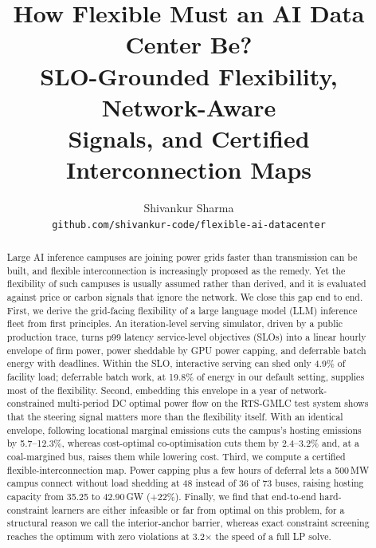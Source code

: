 \documentclass{article} %
\title{How Flexible Must an AI Data Center Be? \\ SLO-Grounded Flexibility, Network-Aware \\ Signals, and Certified Interconnection Maps}
\author{Shivankur Sharma\\
\texttt{github.com/shivankur-code/flexible-ai-datacenter}
}
\begin{document}
\maketitle
{}

\begin{abstract}
Large AI inference campuses are joining power grids faster than transmission can be built, and flexible interconnection is increasingly proposed as the remedy. Yet the flexibility of such campuses is usually assumed rather than derived, and it is evaluated against price or carbon signals that ignore the network. We close this gap end to end. First, we derive the grid-facing flexibility of a large language model (LLM) inference fleet from first principles. An iteration-level serving simulator, driven by a public production trace, turns p99 latency service-level objectives (SLOs) into a linear hourly envelope of firm power, power sheddable by GPU power capping, and deferrable batch energy with deadlines. Within the SLO, interactive serving can shed only 4.9\% of facility load; deferrable batch work, at 19.8\% of energy in our default setting, supplies most of the flexibility. Second, embedding this envelope in a year of network-constrained multi-period DC optimal power flow on the RTS-GMLC test system shows that the steering signal matters more than the flexibility itself. With an identical envelope, following locational marginal emissions cuts the campus's hosting emissions by 5.7--12.3\%, whereas cost-optimal co-optimisation cuts them by 2.4--3.2\% and, at a coal-margined bus, raises them while lowering cost. Third, we compute a certified flexible-interconnection map. Power capping plus a few hours of deferral lets a 500\,MW campus connect without load shedding at 48 instead of 36 of 73 buses, raising hosting capacity from 35.25 to 42.90\,GW (+22\%). Finally, we find that end-to-end hard-constraint learners are either infeasible or far from optimal on this problem, for a structural reason we call the interior-anchor barrier, whereas exact constraint screening reaches the optimum with zero violations at 3.2$\times$ the speed of a full LP solve.
\end{abstract}
\end{document}
